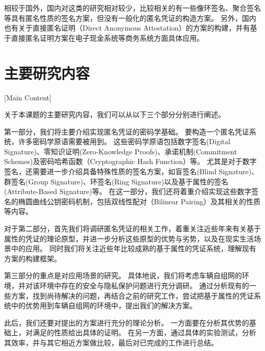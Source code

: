 相较于国外，国内对这类的研究相对较少，比较相关的有一些像环签名、聚合签名等具有匿名性质的签名方案\cite{张严2012匿名凭证方案研究进展,胡江红2017可证明安全的基于证书聚合签名方案}，但没有一般化的匿名凭证的构造方案。
另外，国内也有关于直接匿名证明（Direct Anonymous Attestation）的方案的构建\cite{张严2012匿名凭证方案研究进展}，并有基于直接匿名证明方案在电子现金系统等商务系统方面具体应用\cite{柳欣2016基于DAA-A的改进可授权电子现金系统,柳欣2016基于DAA的轻量级多商家多重息票系统}。

\section{主要研究内容}[Main Content]

关于本课题的主要研究内容，我们可以从以下三个部分分别进行阐述。

第一部分，我们将主要介绍实现匿名凭证的密码学基础。
要构造一个匿名凭证系统，许多密码学原语需要被用到。
这些密码学原语包括数字签名(Digital Signature)、零知识证明(Zero-Knowledge Proofs)、承诺机制(Commitment Schemes)及密码哈希函数（Cryptographic Hash Function）等。
尤其是对于数字签名，还需要进一步介绍具备特殊性质的签名方案，如盲签名(Blind Signature)、群签名(Group Signature)、环签名(Ring Signature)以及基于属性的签名(Attribute-Based Signature)等。
在这一部分，我们还将着重介绍实现这些数字签名的椭圆曲线公钥密码机制，包括双线性配对（Bilinear Pairing）及其相关的性质等内容。

对于第二部分，首先我们将调研匿名凭证的相关工作，着重关注近些年来有关基于属性的凭证的理论原型，并进一步分析这些原型的优势与劣势，以及在现实生活场景中的应用。
同时我们将关注近些年比较成熟的基于属性的凭证系统，理解现有方案的构建框架。

第三部分的重点是对应用场景的研究。
具体地说，我们将考虑车辆自组网的环境，并对该环境中存在的安全与隐私保护问题进行充分调研。
通过分析现有的一些方案，找到尚待解决的问题，再结合之前的研究工作，尝试把基于属性的凭证系统中的优势用到车辆自组网的环境中，提出我们的解决方案。

此后，我们还要对提出的方案进行充分的理论分析。
一方面要在分析其优势的基础上，对满足的性质给出具体的证明。
在另一方面，通过具体的实验测试，分析其效率，并与其它相近方案做比较，最后对已完成的工作进行总结。